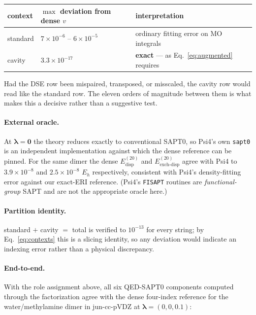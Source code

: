 \documentclass[11pt]{article}
\newcommand{\lam}{\bm{\lambda}}
\begin{document}
\begin{center}
\small
\begin{tabular}{lll}
\toprule
context & $\max$ deviation from dense $v$ & interpretation \\
\midrule
\textsf{standard} & $7\times10^{-6}$ -- $6\times10^{-5}$ &
  ordinary fitting error on MO integrals \\
\textsf{cavity} & $3.3\times10^{-17}$ &
  \textbf{exact} --- as Eq.~\eqref{eq:augmented} requires \\
\bottomrule
\end{tabular}
\end{center}

\noindent
Had the DSE row been mispaired, transposed, or misscaled, the cavity row would
read like the standard row. The eleven orders of magnitude between them is what
makes this a decisive rather than a suggestive test.

\paragraph{External oracle.} At $\lam = \bm 0$ the theory reduces exactly to
conventional SAPT0, so Psi4's own \texttt{sapt0} is an independent
implementation against which the dense reference can be pinned. For the same
dimer the dense $E^{(20)}_{\mathrm{disp}}$ and
$E^{(20)}_{\mathrm{exch\text{-}disp}}$ agree with Psi4 to
$3.9\times10^{-8}$ and $2.5\times10^{-8}$ $E_h$ respectively, consistent with
Psi4's density-fitting error against our exact-ERI reference. (Psi4's
\texttt{FISAPT} routines are \emph{functional-group} SAPT and are not the
appropriate oracle here.)

\paragraph{Partition identity.} \textsf{standard} $+$ \textsf{cavity} $=$
\textsf{total} is verified to $10^{-13}$ for every string; by
Eq.~\eqref{eq:contexts} this is a slicing identity, so any deviation would
indicate an indexing error rather than a physical discrepancy.

\paragraph{End-to-end.} With the role assignment above, all six QED-SAPT0
components computed through the factorization agree with the dense four-index
reference for the water/methylamine dimer in jun-cc-pVDZ at
$\lam = (0,0,0.1)$:
\end{document}
